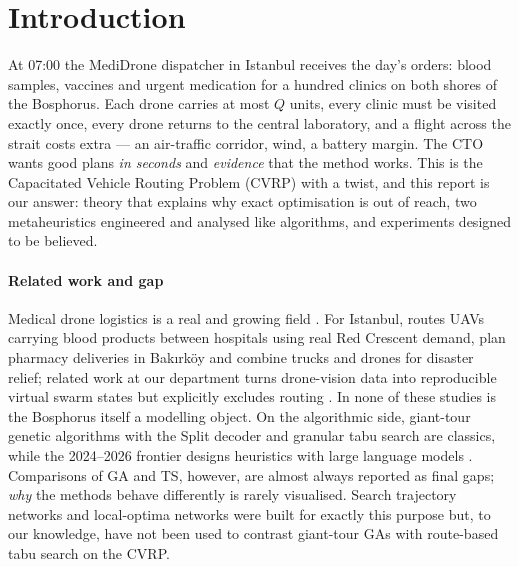 \section{Introduction}\label{sec:intro}
At 07:00 the MediDrone dispatcher in Istanbul receives the day's orders: blood samples,
vaccines and urgent medication for a hundred clinics on both shores of the Bosphorus. Each drone
carries at most $Q$ units, every clinic must be visited exactly once, every drone returns to the
central laboratory, and a flight across the strait costs extra --- an air-traffic corridor, wind,
a battery margin. The CTO wants good plans \emph{in seconds} and \emph{evidence} that the method works.
This is the Capacitated Vehicle Routing Problem (CVRP) \citep{dantzig1959truck,toth2014vrp}
with a twist, and this report is our answer: theory that explains why exact optimisation is out of
reach, two metaheuristics engineered and analysed like algorithms, and experiments designed to be
believed.

\paragraph{Related work and gap} Medical drone logistics is a real and growing field
\citep{amukele2017drone,ackerman2019blood,dorling2017vehicle,otto2018optimization,macrina2020drone}.
For Istanbul, \citet{ozkan2023multi} routes UAVs carrying blood products between hospitals using real Red
Crescent demand, \citet{han2019mathematical} plan pharmacy deliveries in Bak{\i}rk\"oy and
\citet{guzey2024collaborative} combine trucks and drones for disaster relief; related work at our
department turns drone-vision data into reproducible virtual swarm states but explicitly excludes
routing \citep{alpay2026pattern}. In none of these studies is the Bosphorus itself a modelling object.
On the algorithmic side, giant-tour genetic algorithms with the Split decoder
\citep{prins2004simple,vidal2016split,vidal2012hybrid,vidal2022hybrid} and granular tabu search
\citep{gendreau1994tabu,taillard1993parallel,toth2003granular} are classics, while the 2024--2026
frontier designs heuristics with large language models \citep{liu2024evolution,ye2024reevo,xie2026enhancing,gungordu2026mosaic}.
Comparisons of GA and TS, however, are almost always reported as final gaps; \emph{why} the
methods behave differently is rarely visualised. Search trajectory networks \citep{ochoa2021search}
and local-optima networks \citep{ochoa2008study,munoz2022local,munoz2022constrained} were built for exactly this
purpose but, to our knowledge, have not been used to contrast giant-tour GAs with route-based tabu search on the CVRP.


